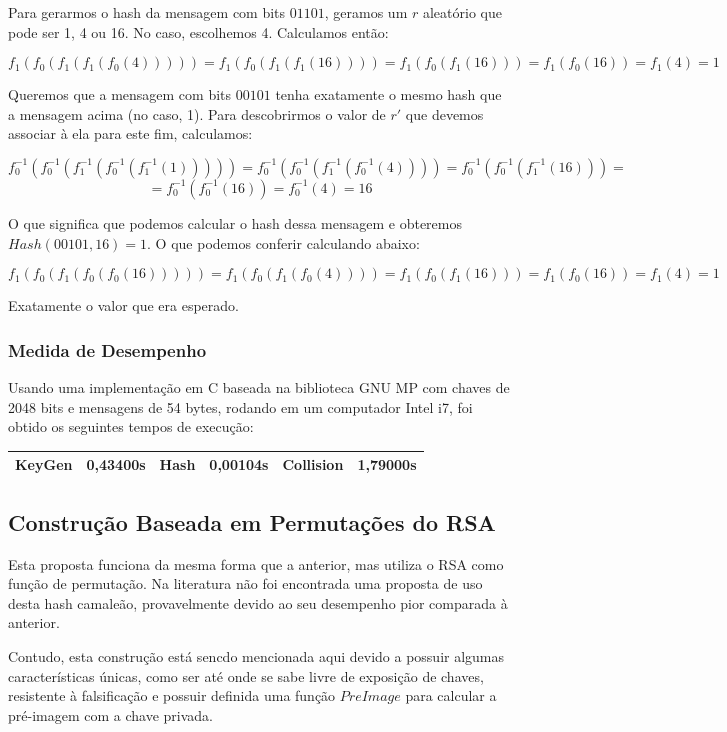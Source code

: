 \documentclass[a4paper]{article}
\begin{document}
Para gerarmos o hash da mensagem com bits $01101$, geramos um $r$
aleatório que pode ser 1, 4 ou 16. No caso, escolhemos 4. Calculamos
então:

$$
f_1(f_0(f_1(f_1(f_0(4))))) = f_1(f_0(f_1(f_1(16)))) = f_1(f_0(f_1(16))) =
f_1(f_0(16)) = f_1(4) = 1
$$

Queremos que a mensagem com bits $00101$ tenha exatamente o mesmo hash
que a mensagem acima (no caso, 1). Para descobrirmos o valor de $r'$
que devemos associar à ela para este fim, calculamos:

$$
f_0^{-1}(f_0^{-1}(f_1^{-1}(f_0^{-1}(f_1^{-1}(1))))) =
f_0^{-1}(f_0^{-1}(f_1^{-1}(f_0^{-1}(4)))) =
f_0^{-1}(f_0^{-1}(f_1^{-1}(16))) =
$$
$$
=f_0^{-1}(f_0^{-1}(16)) = f_0^{-1}(4) = 16
$$

O que significa que podemos calcular o hash dessa mensagem e obteremos
$Hash(00101, 16)=1$. O que podemos conferir calculando abaixo:

$$
f_1(f_0(f_1(f_0(f_0(16))))) = f_1(f_0(f_1(f_0(4)))) = f_1(f_0(f_1(16))) =
f_1(f_0(16)) = f_1(4) = 1
$$

Exatamente o valor que era esperado.

\subsubsection{Medida de Desempenho}

Usando uma implementação em C baseada na biblioteca GNU MP com chaves
de 2048 bits e mensagens de 54 bytes, rodando em um computador Intel
i7, foi obtido os seguintes tempos de execução:

\begin{center}
\begin{tabular}{|c|c|c|c|c|c|}
  \hline
  KeyGen & 0,43400s & Hash & 0,00104s & Collision & 1,79000s\\
  \hline
\end{tabular}
\end{center}


\subsection{Construção Baseada em Permutações do RSA}

Esta proposta funciona da mesma forma que a anterior, mas utiliza o
RSA como função de permutação. Na literatura não foi encontrada uma
proposta de uso desta hash camaleão, provavelmente devido ao seu
desempenho pior comparada à anterior. 

Contudo, esta construção está sencdo mencionada aqui devido a possuir
algumas características únicas, como ser até onde se sabe livre de
exposição de chaves, resistente à falsificação e possuir definida uma
função $PreImage$ para calcular a pré-imagem com a chave privada.
\end{document}
